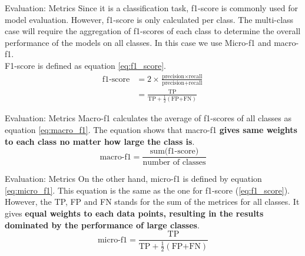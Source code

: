 \begin{frame} {Evaluation: Metrics}
Since it is a classification task, f1-score is commonly used for model evaluation. However, f1-score is only calculated per class. 
The multi-class case will require the aggregation of f1-scores of each class to determine the overall performance of the models on all classes. In this case we use Micro-f1 and macro-f1.\\[10pt]
F1-score is defined as equation \autoref{eq:f1_score}.
\begin{equation}\label{eq:f1_score}
	\begin{split}
		\text{f1-score} &= 2\times \frac{\text{precision} \times \text{recall}}{\text{precision} + \text{recall}}\\
		&= \frac{\text{TP}}{\text{TP}+\frac{1}{2}(\text{FP+FN})}
	\end{split}
\end{equation}
\end{frame} 

\begin{frame} {Evaluation: Metrics}
Macro-f1 calculates the average of f1-scores of all classes as equation \autoref{eq:macro_f1}.
The equation shows that macro-f1 \textbf{gives same weights to each class no matter how large the class is}. 
\begin{equation}\label{eq:macro_f1}
	\text{macro-f1} = \frac{\text{sum(f1-score)}}{\text{number of classes}}
\end{equation}
\end{frame} 

\begin{frame} {Evaluation: Metrics}
On the other hand, micro-f1 is defined by equation \autoref{eq:micro_f1}. This equation is the same as the one for f1-score (\autoref{eq:f1_score}). However, the TP, FP and FN stands for the sum of the metrices for all classes. It gives \textbf{equal weights to each data points, resulting in the results dominated by the performance of large classes}.
\begin{equation}\label{eq:micro_f1}
	\text{micro-f1} = \frac{\text{TP}}{\text{TP}+\frac{1}{2}(\text{FP+FN})}
\end{equation}
\end{frame} 

